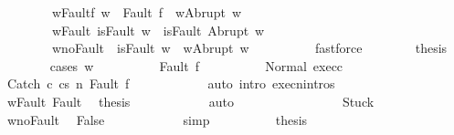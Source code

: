 \begin{isabellebody}
\ \ \ \ \ \ \ \ w{\isacharprime}{\isacharunderscore}Fault{\isacharunderscore}f{\isacharcolon}\ {\isachardoublequoteopen}w{\isacharprime}\ {\isacharequal}\ Fault\ f\ {\isasymlongrightarrow}\ w{\isacharprime}{\isacharequal}Abrupt\ w{\isachardoublequoteclose}\ \isanewline
\ \ \ \ \ \ \ \ w{\isacharprime}{\isacharunderscore}Fault{\isacharcolon}\ {\isachardoublequoteopen}isFault\ w{\isacharprime}\ {\isasymlongrightarrow}\ isFault\ {\isacharparenleft}Abrupt\ w{\isacharparenright}{\isachardoublequoteclose}\ \isanewline
\ \ \ \ \ \ \ \ w{\isacharprime}{\isacharunderscore}noFault{\isacharcolon}\ {\isachardoublequoteopen}{\isasymnot}\ isFault\ w{\isacharprime}\ {\isasymlongrightarrow}\ w{\isacharprime}{\isacharequal}Abrupt\ w{\isachardoublequoteclose}\isanewline
\ \ \ \ \ \ \ \ \isamarkupfalse%
\ fastforce\isanewline
\ \ \ \ \ \ \isamarkupfalse%
\ {\isacharquery}thesis\isanewline
\ \ \ \ \ \ \isamarkupfalse%
\ {\isacharparenleft}cases\ {\isachardoublequoteopen}w{\isacharprime}{\isachardoublequoteclose}{\isacharparenright}\isanewline
\ \ \ \ \ \ \ \ \isamarkupfalse%
\ {\isacharparenleft}Fault\ f{\isacharprime}{\isacharparenright}\isanewline
\ \ \ \ \ \ \ \ \isamarkupfalse%
\ Normal\ exec{\isacharunderscore}c{}\ \isamarkupfalse%
\ {\isachardoublequoteopen}{\isasymGamma}{\isasymturnstile}{\isasymlangle}Catch\ c{}\ c{}{\isacharcomma}s{\isasymrangle}\ {\isacharequal}n{\isasymRightarrow}\ Fault\ f{\isacharprime}{\isachardoublequoteclose}\isanewline
\ \ \ \ \ \ \ \ \ \ \isamarkupfalse%
\ {\isacharparenleft}auto\ intro{\isacharcolon}\ execn{\isachardot}intros{\isacharparenright}\isanewline
\ \ \ \ \ \ \ \ \isamarkupfalse%
\ w{\isacharprime}{\isacharunderscore}Fault\ Fault\ \isamarkupfalse%
\ {\isacharquery}thesis\isanewline
\ \ \ \ \ \ \ \ \ \ \isamarkupfalse%
\ auto\isanewline
\ \ \ \ \ \ \isamarkupfalse%
\isanewline
\ \ \ \ \ \ \ \ \isamarkupfalse%
\ Stuck\isanewline
\ \ \ \ \ \ \ \ \isamarkupfalse%
\ w{\isacharprime}{\isacharunderscore}noFault\ \isamarkupfalse%
\ False\isanewline
\ \ \ \ \ \ \ \ \ \ \isamarkupfalse%
\ simp\isanewline
\ \ \ \ \ \ \ \ \isamarkupfalse%
\ {\isacharquery}thesis\ \isacommand{{\isachardot}{\isachardot}}\isamarkupfalse%
\isanewline
\ \ \ \ \ \ \isamarkupfalse%
\isanewline
\ \ \ \ \ \ \ \ \isamarkupfalse%

\end{isabellebody}

